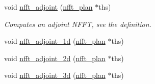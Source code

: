 \begin{CompactItemize}
\item 
void \hyperlink{group__nfft_g4b44c1dd52026dcb494dc735f0fa5b08}{nfft\_\-adjoint} (\hyperlink{structnfft__plan}{nfft\_\-plan} $\ast$ths)
\begin{CompactList}\small\item\em Computes an adjoint NFFT, see the definition. \item\end{CompactList}\item 
\hypertarget{group__nfft_g13f8052bab72ec8994354cdd6ccb6982}{
void \hyperlink{group__nfft_g13f8052bab72ec8994354cdd6ccb6982}{nfft\_\-adjoint\_\-1d} (\hyperlink{structnfft__plan}{nfft\_\-plan} $\ast$ths)}
\label{group__nfft_g13f8052bab72ec8994354cdd6ccb6982}

\item 
\hypertarget{group__nfft_gda6d6c809694e08aac88fa0204192325}{
void \hyperlink{group__nfft_gda6d6c809694e08aac88fa0204192325}{nfft\_\-adjoint\_\-2d} (\hyperlink{structnfft__plan}{nfft\_\-plan} $\ast$ths)}
\label{group__nfft_gda6d6c809694e08aac88fa0204192325}

\item 
\hypertarget{group__nfft_g4469a1fc88e71eaff7b6912a15079195}{
void \hyperlink{group__nfft_g4469a1fc88e71eaff7b6912a15079195}{nfft\_\-adjoint\_\-3d} (\hyperlink{structnfft__plan}{nfft\_\-plan} $\ast$ths)}
\label{group__nfft_g4469a1fc88e71eaff7b6912a15079195}


\end{CompactItemize}
